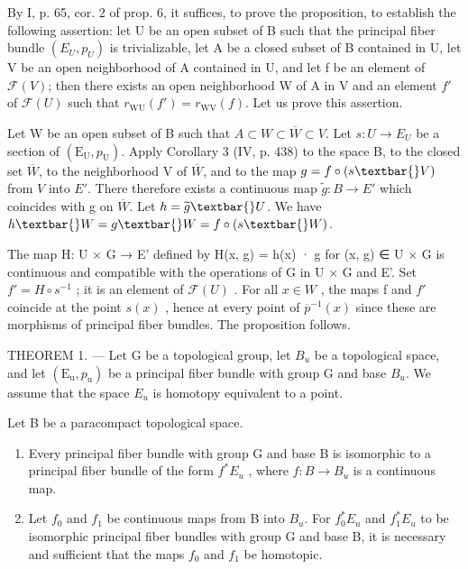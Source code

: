 By I, p. 65, cor. 2 of prop. 6, it suffices, to prove the proposition, to establish the following assertion: let U be an open subset of B such that the principal fiber bundle \((E_{U}, p_{U})\) is trivializable, let A be a closed subset of B contained in U, let V be an open neighborhood of A contained in U, and let f be an element of \(\mathcal{F}(V)\); then there exists an open neighborhood W of A in V and an element \(f'\) of \(\mathcal{F}(U)\) such that \(r_{\mathrm{WU}}(f') = r_{\mathrm{WV}}(f)\). Let us prove this assertion.

Let W be an open subset of B such that \(A \subset W \subset \overline{W} \subset V\). Let \(s: U \to E_{U}\) be a section of \((\mathrm{E}_{\mathrm{U}}, p_{\mathrm{U}})\). Apply Corollary 3 (IV, p. 438) to the space B, to the closed set \(\overline{W}\), to the neighborhood V of \(\overline{W}\), and to the map \(g = f \circ (s\textbar{} V)\) from \(V\) into \(E'\). There therefore exists a continuous map \(\widetilde{g}: B \to E'\) which coincides with g on \(\overline{W}\). Let \(h = \widetilde{g}\textbar{} U\). We have \(h\textbar{} W = g\textbar{} W = f \circ (s\textbar{} W)\).

The map H: U × G → E' defined by H(x, g) = h(x) · g for (x, g) ∈ U × G is continuous and compatible with the operations of G in U × G and E'. Set \(f' = H \circ s^{-1}\) ; it is an element of \(\mathcal{F}(U)\) . For all \(x \in W\) , the maps f and \(f'\) coincide at the point \(s(x)\) , hence at every point of \(\overline{p}^{-1}(x)\) since these are morphisms of principal fiber bundles. The proposition follows.

THEOREM 1. --- Let G be a topological group, let \(B_{u}\) be a topological space, and let \((\mathrm{E}_{\mathrm{u}}, p_{\mathrm{u}})\) be a principal fiber bundle with group G and base \(B_{u}\). We assume that the space \(E_{u}\) is homotopy equivalent to a point.

Let B be a paracompact topological space.

\begin{enumerate}
\def\labelenumi{\alph{enumi})}
\item
  Every principal fiber bundle with group G and base B is isomorphic to a principal fiber bundle of the form \(f^{*}E_{u}\) , where \(f: B \to B_{u}\) is a continuous map.
\item
  Let \(f_{0}\) and \(f_{1}\) be continuous maps from B into \(B_{u}\). For \(f_{0}^{*}E_{u}\) and \(f_{1}^{*}E_{u}\) to be isomorphic principal fiber bundles with group G and base B, it is necessary and sufficient that the maps \(f_{0}\) and \(f_{1}\) be homotopic.
\end{enumerate}

